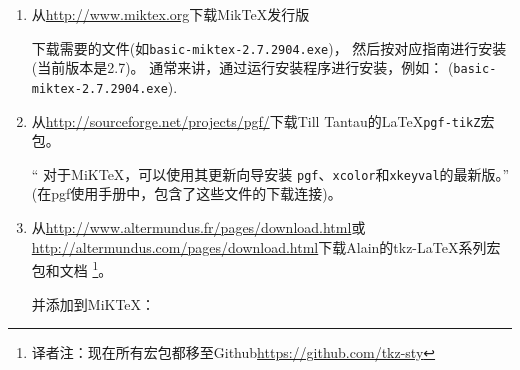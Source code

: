 \documentclass[DIV=14,
               fontsize=10,
               headinclude=false,
               index=totoc,
               footinclude=false,
               headings=small]{tkz-doc-zh}
\begin{document}
\begin{enumerate}

	\item 从\url{http://www.miktex.org}下载MikTeX发行版


      下载需要的文件(如\texttt{basic-miktex-2.7.2904.exe})，
	  然后按对应指南进行安装(当前版本是2.7)。 
	  通常来讲，通过运行安装程序进行安装，例如：\newline
	  (\texttt{basic-miktex-2.7.2904.exe}).

  \item 从\url{http://sourceforge.net/projects/pgf/}下载Till Tantau的\LaTeX{}\texttt{pgf-tikZ}宏包。

	  \enquote{
		  对于MiKTeX，可以使用其更新向导安装
		  \texttt{pgf}、\texttt{xcolor}和\texttt{xkeyval}的最新版。}
      (在pgf使用手册中，包含了这些文件的下载连接)。
  \item 从\url{http://www.altermundus.fr/pages/download.html}或
	  \url{http://altermundus.com/pages/download.html}下载Alain的tkz-\LaTeX{}系列宏包和文档
	  \footnote{译者注：现在所有宏包都移至Github\url{https://github.com/tkz-sty}}。

	  并添加到MiKTeX：


\end{enumerate}
\end{document}
